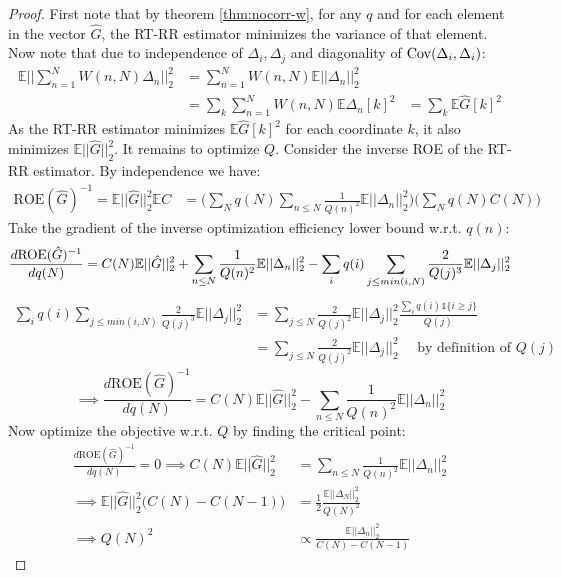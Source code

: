 \begin{proof}
First note that by theorem \ref{thm:nocorr-w}, for any $q$ and for each element in the vector
$\hat{G}$, the RT-RR estimator minimizes the variance of that element. Now note
that due to independence of $\Delta_i, \Delta_j$ and diagonality of $\mathrm{Cov}(\Delta_i, \Delta_i)$:
\begin{align*}
\mathbb{E} ||\sum_{n=1}^N W(n, N) \Delta_n||_2^2 &= \sum_{n=1}^N W(n, N) \mathbb{E} ||\Delta_n||_2^2\\
&= \sum_k \sum_{n=1}^N W(n, N) \mathbb{E}\Delta_n[k]^2
&= \sum_k \mathbb{E} \hat{G}[k]^2
\end{align*}
As the RT-RR estimator minimizes $\mathbb{E} \hat{G}[k]^2$ for each coordinate $k$,
it also minimizes $\mathbb{E} ||\hat{G}||_2^2$. It remains to optimize $Q$.
Consider the inverse ROE of the RT-RR estimator. By independence we have:
\begin{align*}
    \text{ROE}(\hat{G})^{-1} = \mathbb{E} ||\hat{G}||_2^2 \mathbb{E} C &=
    \Big(\sum_N q(N) \sum_{n\leq N} \frac{1}{Q(n)^2} \mathbb{E} ||\Delta_n||_2^2\Big) \Big(\sum_N q(N) C(N)\Big)
\end{align*}
Take the gradient of the inverse optimization efficiency lower bound w.r.t. $q(n)$:
\[
\frac{d\text{ROE}(\hat{G})^{-1}}{dq(N)} = C(N) \mathbb{E} ||\hat{G}||_2^2 + \sum_{n \leq N} \frac{1}{Q(n)^2} \mathbb{E} ||\Delta_n||_2^2 - \sum_{i} q(i) \sum_{j \leq min(i, N)} \frac{2}{Q(j)^3} \mathbb{E} ||\Delta_j||_2^2\\
\]
\begin{align*}
\sum_{i} q(i) \sum_{j \leq min(i, N)} \frac{2}{Q(j)^3} \mathbb{E} ||\Delta_j||_2^2 &= \sum_{j \leq N} \frac{2}{Q(j)^2} \mathbb{E} ||\Delta_j||_2^2 \frac{\sum_i q(i) \mathds{1}\{i \geq j\}}{Q(j)}\\
&= \sum_{j \leq N} \frac{2}{Q(j)^2} \mathbb{E} ||\Delta_j||_2^2 \quad \text{ by definition of } Q(j)
\end{align*}
\[
\implies \frac{d\text{ROE}(\hat{G})^{-1}}{dq(N)} = C(N) \mathbb{E} ||\hat{G}||_2^2 - \sum_{n \leq N} \frac{1}{Q(n)^2} \mathbb{E} ||\Delta_n||_2^2
\]
Now optimize the objective w.r.t. $Q$ by finding the critical point:
\begin{align*}
\frac{d\text{ROE}(\hat{G})^{-1}}{dq(N)} = 0 \implies C(N) \mathbb{E} ||\hat{G}||_2^2 &=  \sum_{n \leq N} \frac{1}{Q(n)^2} \mathbb{E} ||\Delta_n||_2^2\\
\implies \mathbb{E} ||\hat{G}||_2^2 \Big(C(N) - C(N-1)\Big) &= \frac{1}{2}  \frac{\mathbb{E}||\Delta_N||_2^2}{Q(N)^2}\\
\implies Q(N)^2 &\propto \frac{\mathbb{E} ||\Delta_n||_2^2}{C(N) - C(N-1)}
\end{align*}
\end{proof}
